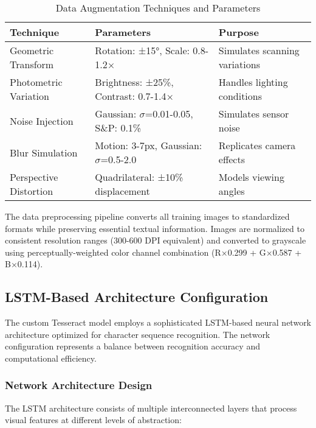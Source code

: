 \begin{table}[H]
\centering
\caption{Data Augmentation Techniques and Parameters}
\label{tab:augmentation_techniques}
{\begin{tabular}{lll}
\toprule
\textbf{Technique} & \textbf{Parameters} & \textbf{Purpose} \\
\midrule
Geometric Transform & Rotation: ±15°, Scale: 0.8-1.2× & Simulates scanning variations \\
Photometric Variation & Brightness: ±25\%, Contrast: 0.7-1.4× & Handles lighting conditions \\
Noise Injection & Gaussian: $\sigma$=0.01-0.05, S\&P: 0.1\% & Simulates sensor noise \\
Blur Simulation & Motion: 3-7px, Gaussian: $\sigma$=0.5-2.0 & Replicates camera effects \\
Perspective Distortion & Quadrilateral: ±10\% displacement & Models viewing angles \\
\bottomrule
\end{tabular}}
\end{table}

The data preprocessing pipeline converts all training images to standardized formats while preserving essential textual information. Images are normalized to consistent resolution ranges (300-600 DPI equivalent) and converted to grayscale using perceptually-weighted color channel combination (R×0.299 + G×0.587 + B×0.114).

\subsection{LSTM-Based Architecture Configuration}

The custom Tesseract model employs a sophisticated LSTM-based neural network architecture optimized for character sequence recognition. The network configuration represents a balance between recognition accuracy and computational efficiency.

\subsubsection{Network Architecture Design}

The LSTM architecture consists of multiple interconnected layers that process visual features at different levels of abstraction:


